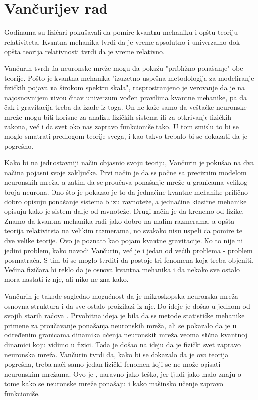 \documentclass[a4paper]{article}
\begin{document}
\section{Vančurijev rad}

Godinama su fizičari pokušavali da pomire kvantnu mehaniku i opštu teoriju relativiteta. Kvantna mehanika tvrdi da je vreme apsolutno i univerzalno dok opšta teorija relativnosti tvrdi da je vreme relativno.

Vančurin tvrdi da neuronske mreže mogu da pokažu "približno ponašanje" obe teorije. Pošto je kvantna mehanika "izuzetno uspešna metodologija za modeliranje fizičkih pojava na širokom spektru skala", rasprostranjeno je verovanje da je na najosnovnijem nivou čitav univerzum vođen pravilima kvantne mehanike, pa da čak i gravitacija treba da izađe iz toga. On ne kaže samo da veštačke neuronske mreže mogu biti korisne za analizu fizičkih sistema ili za otkrivanje fizičkih zakona, već i da svet oko nas zapravo funkcioniše tako. U tom smislu to bi se moglo smatrati predlogom teorije svega, i kao takvo trebalo bi se dokazati da je pogrešno. 

Kako bi na jednostavniji način objasnio svoju teoriju, Vančurin je pokušao na dva načina pojasni svoje zaključke. Prvi način je da se počne sa preciznim modelom neuronskih mreža, a zatim da se proučava ponašanje mreže u granicama velikog broja neurona. Ono što je pokazao je to da jednačine kvantne mehanike prilično dobro opisuju ponašanje sistema blizu ravnoteže, a jednačine klasične mehanike opisuju kako je sistem dalje od ravnoteže. Drugi način je da krenemo od fizike. Znamo da kvantna mehanika radi jako dobro na malim razmerama, a opšta teorija relativiteta na velikim razmerama, no svakako nisu uspeli da pomire te dve velike teorije. Ovo je poznato kao pojam kvantne gravitacije. No to nije ni jedini problem, kako navodi Vančurin, već je i jedan od većih problema - problem posmatrača. S tim bi se moglo tvrditi da postoje tri fenomena koja treba objeniti. Većina fizičara bi reklo da je osnova kvantna mehanika i da nekako sve ostalo mora nastati iz nje, ali niko ne  zna kako. 

Vančurin je takođe sagledao mogućnost da je mikroskopska neuronska mreža osnovna struktura i da sve ostalo proizilazi iz nje. Do ideje je došao u jednom od svojih starih radova \cite{5}. Prvobitna ideja je bila da se metode statističke mehanike primene za proučavanje ponašanja neuronskih mreža, ali se pokazalo da je u određenim granicama dinamika učenja neuronskih mreža veoma slična kvantnoj dinamici koju vidimo u fizici. Tada je došao na ideju da je fizički svet zapravo neuronska mreža. Vančurin tvrdi da, kako bi se dokazalo da je ova teorija pogrešna, treba naći samo jedan fizički fenomen koji se ne može opisati neuronskim mrežama. Ovo je , naravno jako teško, jer ljudi jako malo znaju o tome kako se neuronske mreže ponašaju i kako mašinsko učenje zapravo funkcioniše. 
\end{document}
